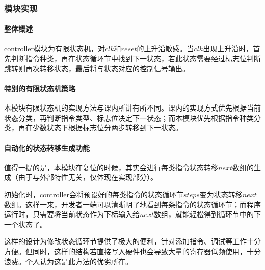 \documentclass[main.tex]{subfiles}
\begin{document}
\subsubsection{模块实现}
\paragraph{整体概述}
controller模块为有限状态机，对$clk$和$reset$的上升沿敏感。当$clk$出现上升沿时，首先判断指令种类，再在状态循环节中找到下一状态，若此状态需要经过标志位判断跳转则再次转移状态，最后将与状态对应的控制信号输出。

\paragraph{特别的有限状态机策略}
本模块有限状态机的实现方法与课内所讲有所不同。课内的实现方式优先根据当前状态分类，再判断指令类型、标志位决定下一状态；而本模块优先根据指令种类分类，再在少数状态下根据标志位分两步转移到下一状态。

\paragraph{自动化的状态转移生成功能}
值得一提的是，本模块在复位的时候，其实会进行每类指令状态转移$next$数组的生成（由于与外部特性无关，仅体现在实现部分）。

初始化时，controller会将预设好的每类指令的状态循环节$steps$变为状态转移$next$数组。这样一来，开发者一端可以清晰明了地看到每条指令的状态循环节；而程序运行时，只需要将当前状态作为下标输入给$next$数组，就能轻松得到循环节中的下一个状态了。

这样的设计为修改状态循环节提供了极大的便利，针对添加指令、调试等工作十分方便。但同时，这样的结构若直接写入硬件也会导致大量的寄存器低频使用，十分浪费。个人认为这是此方法的优劣所在。

\clearpage
\end{document}
